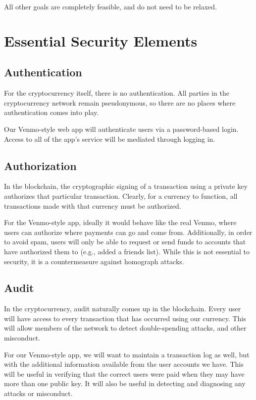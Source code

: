\documentclass[12pt]{article}
\begin{document}
All other goals are completely feasible, and do not need to be relaxed.

\section{Essential Security Elements}

\subsection{Authentication}

For the cryptocurrency itself, there is no authentication. All parties in the cryptocurrency network remain pseudonymous, so there are no places where authentication comes into play.

Our Venmo-style web app will authenticate users via a password-based login. Access to all of the app's service will be mediated through logging in.

\subsection{Authorization}

In the blockchain, the cryptographic signing of a transaction using a private key authorizes that particular transaction. Clearly, for a currency to function, all transactions made with that currency must be authorized.

For the Venmo-style app, ideally it would behave like the real Venmo, where users can authorize where payments can go and come from.
Additionally, in order to avoid spam, users will only be able to request or send funds to accounts that have authorized them to (e.g., added a friends list).
While this is not essential to security, it is a countermeasure against homograph attacks.

\subsection{Audit}

In the cryptocurrency, audit naturally comes up in the blockchain. Every user will have access to every transaction that has occurred using our currency. This will allow members of the network to detect double-spending attacks, and other misconduct.

For our Venmo-style app, we will want to maintain a transaction log as well, but with the additional information available from the user accounts we have.
This will be useful in verifying that the correct users were paid when they may have more than one public key. It will also be useful in detecting and diagnosing any attacks or misconduct.
\end{document}
